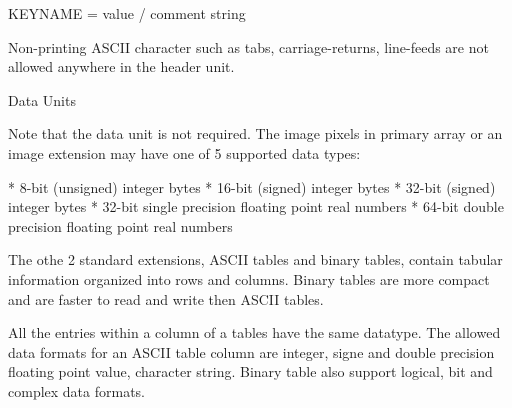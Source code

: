 \begtt
KEYNAME = value / comment string
\endtt

Non-printing ASCII character such as tabs,
carriage-returns, line-feeds are not allowed anywhere in
the header unit.

\secc Data Units

Note that the data unit is not required. The image pixels
in primary array or an image extension may have one of
5 supported data types:

\begitems
* 8-bit (unsigned) integer bytes
* 16-bit (signed) integer bytes
* 32-bit (signed) integer bytes
* 32-bit single precision floating point real numbers
* 64-bit double precision floating point real numbers
\enditems

The othe 2 standard extensions, ASCII tables and binary
tables, contain tabular information organized into rows
and columns. Binary tables are more compact and are faster
to read and write then ASCII tables.

All the entries within a column of a tables have the same
datatype. The allowed data formats for an ASCII table
column are integer, signe and double precision floating
point value, character string. Binary table also support
logical, bit and complex data formats.
